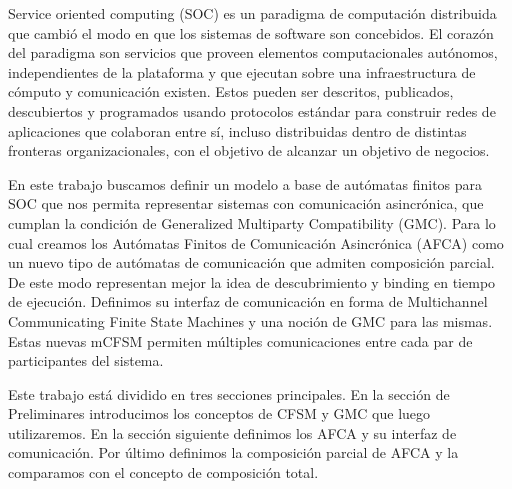 Service oriented computing (SOC) es un paradigma de computación distribuida que cambió el modo en que los sistemas de software son concebidos. El corazón del paradigma son servicios que proveen elementos computacionales autónomos, independientes de la plataforma y que ejecutan sobre una infraestructura de cómputo y comunicación existen. Estos pueden ser descritos, publicados, descubiertos y programados usando protocolos estándar para construir redes de aplicaciones que colaboran entre sí, incluso distribuidas dentro de distintas fronteras organizacionales, con el objetivo de alcanzar un objetivo de negocios.

En este trabajo buscamos definir un modelo a base de autómatas finitos para SOC que nos permita representar sistemas con comunicación asincrónica, que cumplan la condición de Generalized Multiparty Compatibility (GMC). Para lo cual creamos los Autómatas Finitos de Comunicación Asincrónica (AFCA) como un nuevo tipo de autómatas de comunicación que admiten composición parcial. De este modo representan mejor la idea de descubrimiento y binding en tiempo de ejecución. Definimos su interfaz de comunicación en forma de Multichannel Communicating Finite State Machines y una noción de GMC para las mismas. Estas nuevas mCFSM permiten múltiples comunicaciones entre cada par de participantes del sistema.
 
Este trabajo está dividido en tres secciones principales. En la sección de Preliminares introducimos los conceptos de CFSM y GMC que luego utilizaremos. En la sección siguiente definimos los AFCA y su interfaz de comunicación. Por último definimos la composición parcial de AFCA y la comparamos con el concepto de composición total.